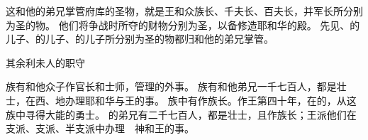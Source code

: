 {这{}和他的弟兄掌管府库的圣物，就是{}王和众族长、千夫长、百夫长，并军长所分别为圣的物。
他们将争战时所夺的财物分别为圣，以备修造耶和华的殿。
先见{}、{}的儿子{}、{}的儿子{}、{}的儿子{}所分别为圣的物都归{}和他的弟兄掌管。
\par }{\SH 其余利未人的职守
\par }{\PP {}族有{}和他众子作官长和士师，管理{}的外事。
族有{}和他弟兄一千七百人，都是壮士，在{}西、{}地办理耶和华与王的事。
族中有{}作族长。{}作王第四十年，在{}的{}，从这族中寻得大能的勇士。
的弟兄有二千七百人，都是壮士，且作族长；{}王派他们在{}支派、{}支派、{}半支派中办理　神和王的事。

}
